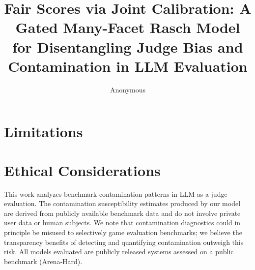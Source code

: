 \documentclass[11pt]{article}
\title{Fair Scores via Joint Calibration: A Gated Many-Facet Rasch Model\\for Disentangling Judge Bias and Contamination in LLM Evaluation}
\author{Anonymous}
\begin{document}
\maketitle









\section*{Limitations}


\section*{Ethical Considerations}
This work analyzes benchmark contamination patterns in LLM-as-a-judge evaluation. The contamination susceptibility estimates produced by our model are derived from publicly available benchmark data and do not involve private user data or human subjects. We note that contamination diagnostics could in principle be misused to selectively game evaluation benchmarks; we believe the transparency benefits of detecting and quantifying contamination outweigh this risk. All models evaluated are publicly released systems assessed on a public benchmark (Arena-Hard).



\appendix

\end{document}
